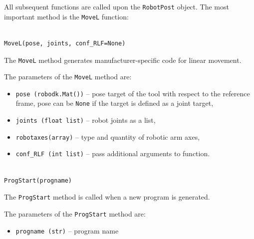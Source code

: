 All subsequent functions are called upon the \texttt{RobotPost} object. The most important method is the \texttt{MoveL} function:


\begin{verbatim}

MoveL(pose, joints, conf_RLF=None)

\end{verbatim}

The \texttt{MoveL} method generates manufacturer-specific code for linear movement. 


The parameters of the \texttt{MoveL} method are:

\begin{itemize}

\item \texttt{pose (robodk.Mat())} -- pose target of the tool with respect to the reference frame, pose can be \texttt{None} if the target is defined as a joint target,

\item \texttt{joints (float list)} -- robot joints as a list,

\item \texttt{robotaxes(array)} -- type and quantity of robotic arm axes,

\item \texttt{conf_RLF (int list)} -- pass additional arguments to function. 

\end{itemize}



\begin{verbatim}

ProgStart(progname)

\end{verbatim}

The \texttt{ProgStart} method is called when a new program is generated.


The parameters of the \texttt{ProgStart} method are:

\begin{itemize}

\item \texttt{progname (str)} -- program name

\end{itemize}

